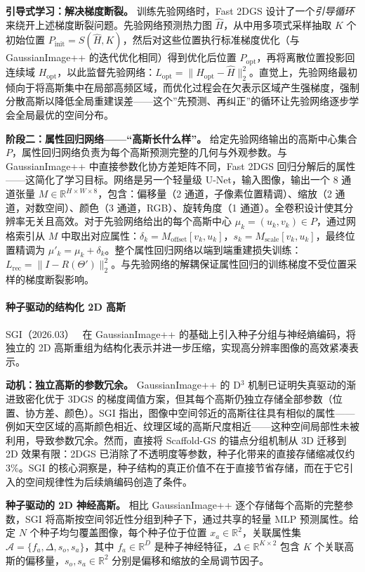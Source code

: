 \textbf{引导式学习：解决梯度断裂。} 训练先验网络时，Fast 2DGS 设计了一个\textit{引导循环}来绕开上述梯度断裂问题。先验网络预测热力图 $\hat{H}$，从中用多项式采样抽取 $K$ 个初始位置 $P_\text{init} = S(\hat{H}, K)$，然后对这些位置执行标准梯度优化（与 GaussianImage++ 的迭代优化相同）得到优化后位置 $P_\text{opt}$，再将离散位置投影回连续域 $H_\text{opt}$，以此监督先验网络：$L_\text{opt} = \|H_\text{opt} - \hat{H}\|_2^2$。直觉上，先验网络最初倾向于将高斯集中在局部高频区域，而优化过程会在欠表示区域产生强梯度，强制分散高斯以降低全局重建误差——这个”先预测、再纠正”的循环让先验网络逐步学会全局最优的空间分布。

\textbf{阶段二：属性回归网络——“高斯长什么样”。} 给定先验网络输出的高斯中心集合 $P$，属性回归网络负责为每个高斯预测完整的几何与外观参数。与 GaussianImage++ 中直接参数化协方差矩阵不同，Fast 2DGS 回归分解后的属性——这简化了学习目标。网络是另一个轻量级 U-Net，输入图像，输出一个 8 通道张量 $M \in \mathbb{R}^{H \times W \times 8}$，包含：偏移量（2 通道，子像素位置精调）、缩放（2 通道，对数空间）、颜色（3 通道，RGB）、旋转角度（1 通道）。全卷积设计使其分辨率无关且高效。对于先验网络给出的每个高斯中心 $\mu_k = (u_k, v_k) \in P$，通过网格索引从 $M$ 中取出对应属性：$\delta_k = M_\text{offset}[v_k, u_k]$，$s_k = M_\text{scale}[v_k, u_k]$，最终位置精调为 $\mu'_k = \mu_k + \delta_k$。整个属性回归网络以端到端重建损失训练：$L_\text{rec} = \|I - R(\Theta')\|_2^2$。与先验网络的解耦保证属性回归的训练梯度不受位置采样的梯度断裂影响。

\paragraph{种子驱动的结构化 2D 高斯}

SGI（2026.03）~\cite{2603_07789} 在 GaussianImage++ 的基础上引入种子分组与神经熵编码，将独立的 2D 高斯重组为结构化表示并进一步压缩，实现高分辨率图像的高效紧凑表示。

\textbf{动机：独立高斯的参数冗余。} GaussianImage++ 的 D$^3$ 机制已证明失真驱动的渐进致密化优于 3DGS 的梯度阈值方案，但其每个高斯仍独立存储全部参数（位置、协方差、颜色）。SGI 指出，图像中空间邻近的高斯往往具有相似的属性——例如天空区域的高斯颜色相近、纹理区域的高斯尺度相近——这种空间局部性未被利用，导致参数冗余。然而，直接将 Scaffold-GS 的锚点分组机制从 3D 迁移到 2D 效果有限：2DGS 已消除了不透明度等参数，种子化带来的直接存储缩减仅约 3\%。SGI 的核心洞察是，种子结构的真正价值不在于直接节省存储，而在于它引入的空间规律性为后续熵编码创造了条件。

\textbf{种子驱动的 2D 神经高斯。} 相比 GaussianImage++ 逐个存储每个高斯的完整参数，SGI 将高斯按空间邻近性分组到种子下，通过共享的轻量 MLP 预测属性。给定 $N$ 个种子均匀覆盖图像，每个种子位于位置 $x_a \in \mathbb{R}^2$，关联属性集 $\mathcal{A} = \{f_a, \Delta, s_o, s_a\}$，其中 $f_a \in \mathbb{R}^D$ 是种子神经特征，$\Delta \in \mathbb{R}^{K \times 2}$ 包含 $K$ 个关联高斯的偏移量，$s_o, s_a \in \mathbb{R}^2$ 分别是偏移和缩放的全局调节因子。


